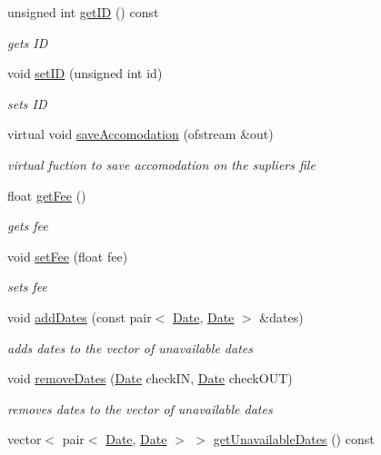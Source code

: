 \begin{DoxyCompactItemize}
unsigned int \hyperlink{class_accomodation_a04d05660220ad6ad31619bdf9bab28e9}{get\+ID} () const
\begin{DoxyCompactList}\small\item\em gets ID \end{DoxyCompactList}\item 
void \hyperlink{class_accomodation_a3d06b872d484b5aa2455d65d98b63645}{set\+ID} (unsigned int id)
\begin{DoxyCompactList}\small\item\em sets ID \end{DoxyCompactList}\item 
virtual void \hyperlink{class_accomodation_a4394eb907b2d5a23faf73dd03c1dac4d}{save\+Accomodation} (ofstream \&out)
\begin{DoxyCompactList}\small\item\em virtual fuction to save accomodation on the supliers file \end{DoxyCompactList}\item 
float \hyperlink{class_accomodation_aa37ad0d3356128f880c00b647d2f2bff}{get\+Fee} ()
\begin{DoxyCompactList}\small\item\em gets fee \end{DoxyCompactList}\item 
void \hyperlink{class_accomodation_a9fc9164c6a0a353538e422ec36db43f4}{set\+Fee} (float fee)
\begin{DoxyCompactList}\small\item\em sets fee \end{DoxyCompactList}\item 
void \hyperlink{class_accomodation_aefbbf86e80b202ca4879fb695cdb7d3d}{add\+Dates} (const pair$<$ \hyperlink{class_date}{Date}, \hyperlink{class_date}{Date} $>$ \&dates)
\begin{DoxyCompactList}\small\item\em adds dates to the vector of unavailable dates \end{DoxyCompactList}\item 
void \hyperlink{class_accomodation_ad77bdf46460657e8670001c91bce72b3}{remove\+Dates} (\hyperlink{class_date}{Date} check\+IN, \hyperlink{class_date}{Date} check\+O\+UT)
\begin{DoxyCompactList}\small\item\em removes dates to the vector of unavailable dates \end{DoxyCompactList}\item 
vector$<$ pair$<$ \hyperlink{class_date}{Date}, \hyperlink{class_date}{Date} $>$ $>$ \hyperlink{class_accomodation_a63c58fd6e01101095522573579490e7b}{get\+Unavailable\+Dates} () const

\end{DoxyCompactItemize}
